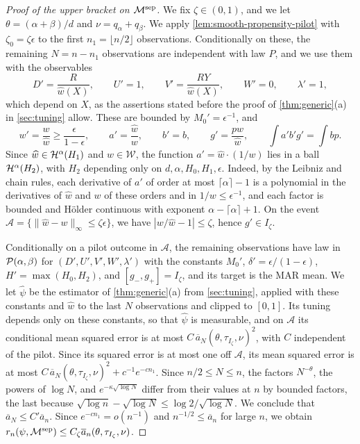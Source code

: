 \begin{proof}[Proof of the upper bracket on $\mathcal M^{\rm sep}$]
We fix $\zeta\in(0,1)$, and we let $\theta=(\alpha+\beta)/d$ and
$\nu=q_\alpha+q_\beta$. We apply
\cref{lem:smooth-propensity-pilot} with $\zeta_0=\zeta\epsilon$ to
the first $n_1=\lfloor n/2\rfloor$ observations. Conditionally on
these, the remaining $N=n-n_1$ observations are independent with law
$P$, and we use them with the observables
\[
 D'=\frac R{\widehat w(X)},\qquad U'=1,\qquad
 V'=\frac{RY}{\widehat w(X)},\qquad W'=0,\qquad\lambda'=1,
\]
which depend on $X$, as the assertions stated before the proof of
\cref{thm:generic}(a) in \cref{sec:tuning} allow. These
are bounded by $M_0'=\epsilon^{-1}$, and
\[
 w'=\frac w{\widehat w}\ge\frac\epsilon{1-\epsilon},\qquad
 a'=\frac{\widehat w}w,\qquad b'=b,\qquad g'=\frac{pw}{\widehat w},\qquad
 \int a'b'g'=\int bp .
\]
Since $\widehat w\in\mathcal H^\alpha(H_1)$ and $w\in\mathcal W$, the function
$a'=\widehat w\cdot(1/w)$ lies in a ball $\mathcal H^\alpha(H_2)$, with $H_2$
depending only on $d,\alpha,H_0,H_1,\epsilon$. Indeed, by the Leibniz
and chain rules, each derivative of $a'$ of order at most $\lceil\alpha\rceil-1$
is a polynomial in the derivatives of $\widehat w$ and $w$ of these
orders and in $1/w\le\epsilon^{-1}$, and each factor is bounded and
H\"older continuous with exponent $\alpha-\lceil\alpha\rceil+1$. On the
event $\mathcal A=\{\|\widehat w-w\|_\infty\le\zeta\epsilon\}$, we have
$|w/\widehat w-1|\le\zeta$, hence $g'\in I_\zeta$.

Conditionally on a pilot outcome in $\mathcal A$, the remaining observations
have law in $\mathcal P(\alpha,\beta)$ for
$(D',U',V',W',\lambda')$ with the constants $M_0'$,
$\delta'=\epsilon/(1-\epsilon)$, $H'=\max(H_0,H_2)$, and
$[g_-,g_+]=I_\zeta$, and its target is the MAR mean. We let $\widehat\psi$ be
the estimator of \cref{thm:generic}(a) from \cref{sec:tuning},
applied with these constants and $\widehat w$ to the last $N$ observations
and clipped to $[0,1]$. Its tuning depends only on these constants, so that
$\widehat\psi$ is measurable, and on $\mathcal A$ its conditional mean
squared error is at most
$C\,\overline a_N(\theta,\tau_{I_\zeta},\nu)^2$, with $C$ independent
of the pilot. Since its squared error is at most one off $\mathcal A$,
its mean squared error is at most
$C\,\overline a_N(\theta,\tau_{I_\zeta},\nu)^2+c^{-1}e^{-cn_1}$. Since
$n/2\le N\le n$, the factors $N^{-\theta}$, the powers of $\log N$, and
$e^{-\kappa\sqrt{\log N}}$ differ from their values at $n$ by bounded
factors, the last because
$\sqrt{\log n}-\sqrt{\log N}\le\log2/\sqrt{\log N}$. We conclude that
$\overline a_N\le C'\overline a_n$. Since $e^{-cn_1}=o(n^{-1})$ and
$n^{-1/2}\le\overline a_n$ for large $n$, we obtain
$r_n(\psi,\mathcal M^{\rm sep})\le
C_\zeta\overline a_n(\theta,\tau_{I_\zeta},\nu)$.
\end{proof}

